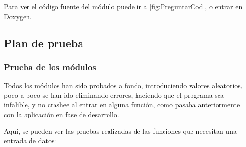 Para ver el código fuente del módulo puede ir a \ref{fig:PreguntarCod}, o entrar en \href{DOC_DOXYGEN/preguntar_8h_source.html}{Doxygen}.
\label{fig:Preguntar}

\subsection{Plan de prueba}

\subsubsection{Prueba de los módulos}

Todos los módulos han sido probados a fondo, introduciendo valores aleatorios, poco a poco se han ido eliminando errores, haciendo que el programa sea infalible,
y no crashee al entrar en alguna función, como pasaba anteriormente con la aplicación en fase de desarrollo.

Aquí, se pueden ver las pruebas realizadas de las funciones que necesitan una entrada de datos:

